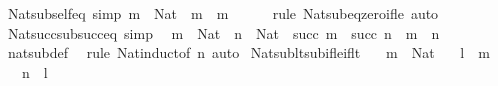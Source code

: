 \begin{isabellebody}
\endisatagproof
{\isafoldproof}%
%
\isadelimproof
\isanewline
%
\endisadelimproof
\isanewline
{}\isamarkupfalse%
\ Nat{\isacharunderscore}{\kern0pt}sub{\isacharunderscore}{\kern0pt}self{\isacharunderscore}{\kern0pt}eq\ {\isacharbrackleft}{\kern0pt}simp{\isacharbrackright}{\kern0pt}{\isacharcolon}{\kern0pt}\ {\isachardoublequoteopen}m\ {\isacharcolon}{\kern0pt}\ Nat\ {\isasymLongrightarrow}\ m\ {\isacharminus}{\kern0pt}\ m\ {\isacharequal}{\kern0pt}\ {}{\isachardoublequoteclose}\isanewline
%
\isadelimproof
\ \ %
\endisadelimproof
%
\isatagproof
{}\isamarkupfalse%
\ {\isacharparenleft}{\kern0pt}rule\ Nat{\isacharunderscore}{\kern0pt}sub{\isacharunderscore}{\kern0pt}eq{\isacharunderscore}{\kern0pt}zero{\isacharunderscore}{\kern0pt}if{\isacharunderscore}{\kern0pt}le{\isacharparenright}{\kern0pt}\ auto%
\endisatagproof
{\isafoldproof}%
%
\isadelimproof
\isanewline
%
\endisadelimproof
\isanewline
{}\isamarkupfalse%
\ Nat{\isacharunderscore}{\kern0pt}succ{\isacharunderscore}{\kern0pt}sub{\isacharunderscore}{\kern0pt}succ{\isacharunderscore}{\kern0pt}eq\ {\isacharbrackleft}{\kern0pt}simp{\isacharbrackright}{\kern0pt}{\isacharcolon}{\kern0pt}\isanewline
\ \ {\isachardoublequoteopen}m\ {\isacharcolon}{\kern0pt}\ Nat\ {\isasymLongrightarrow}\ n\ {\isacharcolon}{\kern0pt}\ Nat\ {\isasymLongrightarrow}\ succ\ m\ {\isacharminus}{\kern0pt}\ succ\ n\ {\isacharequal}{\kern0pt}\ m\ {\isacharminus}{\kern0pt}\ n{\isachardoublequoteclose}\isanewline
%
\isadelimproof
\ \ %
\endisadelimproof
%
\isatagproof
{}\isamarkupfalse%
\ nat{\isacharunderscore}{\kern0pt}sub{\isacharunderscore}{\kern0pt}def\ \isamarkupfalse%
\ {\isacharparenleft}{\kern0pt}rule\ Nat{\isacharunderscore}{\kern0pt}induct{\isacharbrackleft}{\kern0pt}of\ n{\isacharbrackright}{\kern0pt}{\isacharparenright}{\kern0pt}\ auto%
\endisatagproof
{\isafoldproof}%
%
\isadelimproof
\isanewline
%
\endisadelimproof
\isanewline
{}\isamarkupfalse%
\ Nat{\isacharunderscore}{\kern0pt}sub{\isacharunderscore}{\kern0pt}lt{\isacharunderscore}{\kern0pt}sub{\isacharunderscore}{\kern0pt}if{\isacharunderscore}{\kern0pt}le{\isacharunderscore}{\kern0pt}if{\isacharunderscore}{\kern0pt}lt{\isacharcolon}{\kern0pt}\isanewline
\ \ \ {\isachardoublequoteopen}m\ {\isacharcolon}{\kern0pt}\ Nat{\isachardoublequoteclose}\isanewline
\ \ \ {\isachardoublequoteopen}l\ {\isacharless}{\kern0pt}\ m{\isachardoublequoteclose}\isanewline
\ \ \ {\isachardoublequoteopen}n\ {\isasymle}\ l{\isachardoublequoteclose}\isanewline

\end{isabellebody}
